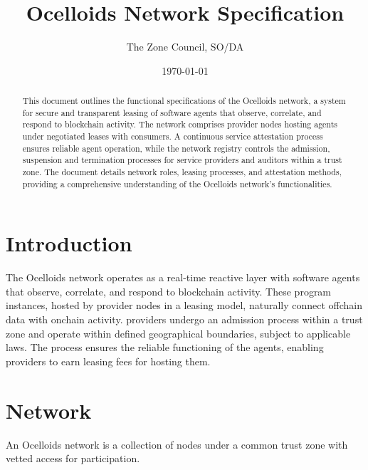 \documentclass{oc}
\begin{document}
\title{Ocelloids Network Specification}
\author{The Zone Council, SO/DA}
\date{\today}
\maketitle


\begin{abstract}
This document outlines the functional specifications of the Ocelloids network, a system for secure and transparent leasing of software agents that observe, correlate, and respond to blockchain activity.
The network comprises provider nodes hosting agents under negotiated leases with consumers.
A continuous service attestation process ensures reliable agent operation, while the network registry controls the admission, suspension and termination processes for service providers and auditors within a trust zone.
The document details network roles, leasing processes, and attestation methods, providing a comprehensive understanding of the Ocelloids network's functionalities.
\end{abstract}


\newpage

\section{Introduction}\label{sec:introduction}

The Ocelloids network operates as a real-time reactive layer with software \glspl*{agent} that observe, correlate, and respond to blockchain activity.
These \gls*{program} instances, hosted by \gls*{provider} nodes in a leasing model, naturally connect offchain data with onchain activity.
\Glspl*{provider} undergo an admission process within a trust zone and operate within defined geographical boundaries, subject to applicable laws.
The  process ensures the reliable functioning of the \glspl*{agent}, enabling \glspl*{provider} to earn leasing fees for hosting them.

\section{Network}

An Ocelloids network is a collection of nodes under a common trust zone with vetted access for participation.
\end{document}
